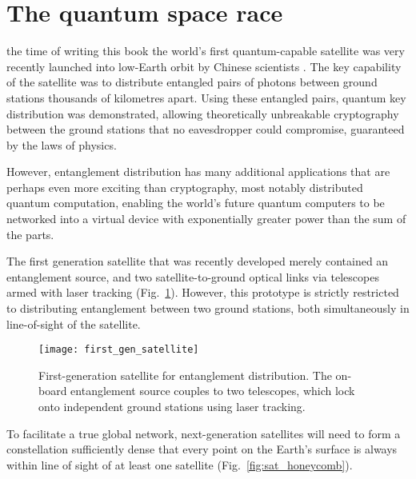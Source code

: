 %
%

\section{The quantum space race}\label{sec:quant_space_race_essay}

 the time of writing this book the world's first quantum-capable satellite was very recently launched into low-Earth orbit by Chinese scientists \cite{JWP}. The key capability of the satellite was to distribute entangled pairs of photons between ground stations thousands of kilometres apart. Using these entangled pairs, quantum key distribution was demonstrated, allowing theoretically unbreakable cryptography between the ground stations that no eavesdropper could compromise, guaranteed by the laws of physics.

However, entanglement distribution has many additional applications that are perhaps even more exciting than cryptography, most notably distributed quantum computation, enabling the world's future quantum computers to be networked into a virtual device with exponentially greater power than the sum of the parts.

The first generation satellite that was recently developed merely contained an entanglement source, and two satellite-to-ground optical links via telescopes armed with laser tracking (Fig.~\ref{fig:first_gen_sat}). However, this prototype is strictly restricted to distributing entanglement between two ground stations, both simultaneously in line-of-sight of the satellite.

\begin{figure}[!htb]
\texttt{[image: first\_gen\_satellite]}
\caption{First-generation satellite for entanglement distribution. The on-board entanglement source couples to two telescopes, which lock onto independent ground stations using laser tracking.}\label{fig:first_gen_sat}	
\end{figure}

To facilitate a true global network, next-generation satellites will need to form a constellation sufficiently dense that every point on the Earth's surface is always within line of sight of at least one satellite (Fig.~\ref{fig:sat_honeycomb}).

